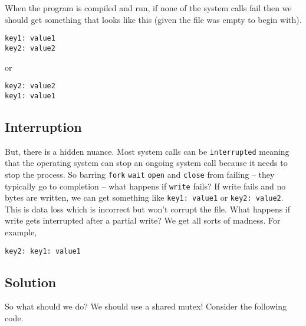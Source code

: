 When the program is compiled and run, if none of the system calls fail
then we should get something that looks like this (given the file was
empty to begin with).

\begin{verbatim}
key1: value1
key2: value2
\end{verbatim}

or

\begin{verbatim}
key2: value2
key1: value1
\end{verbatim}

\subsection{Interruption}\label{interruption}

But, there is a hidden nuance. Most system calls can be
\texttt{interrupted} meaning that the operating system can stop an
ongoing system call because it needs to stop the process. So barring
\texttt{fork} \texttt{wait} \texttt{open} and \texttt{close} from
failing -- they typically go to completion -- what happens if
\texttt{write} fails? If write fails and no bytes are written, we can
get something like \texttt{key1:\ value1} or \texttt{key2:\ value2}.
This is data loss which is incorrect but won't corrupt the file. What
happens if write gets interrupted after a partial write? We get all
sorts of madness. For example,

\begin{verbatim}
key2: key1: value1
\end{verbatim}

\subsection{Solution}\label{solution}

So what should we do? We should use a shared mutex! Consider the
following code.

